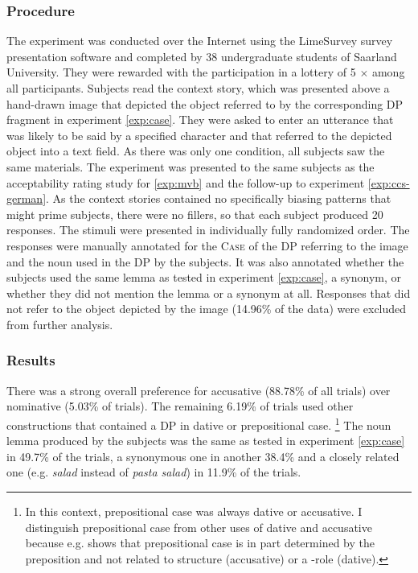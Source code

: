 \subsubsection{Procedure}
The experiment was conducted over the Internet using the LimeSurvey survey presentation software and completed by 38 undergraduate students of Saarland University. They were rewarded with the participation in a lottery of 5 $\times$  among all participants. Subjects read the context story, which was presented above a hand-drawn image that depicted the object referred to by the corresponding DP fragment in experiment \ref{exp:case}. They were asked to enter an utterance that was likely to be said by a specified character and that referred to the depicted object into a text field. As there was only one condition, all subjects saw the same materials. The experiment was presented to the same subjects as the acceptability rating study for \ref{exp:mvb} and the follow-up to experiment \ref{exp:ccs-german}. As the context stories contained no specifically biasing patterns that might prime subjects, there were no fillers, so that each subject produced 20 responses. The stimuli were presented in individually fully randomized order. The responses were manually annotated for the \textsc{Case} of the DP referring to the image and the noun used in the DP by the subjects. It was also annotated whether the subjects used the same lemma as tested in experiment \ref{exp:case}, a synonym, or whether they did not mention the lemma or a synonym at all. Responses that did not refer to the object depicted by the image (14.96\% of the data) were excluded from further analysis.

\subsubsection{Results}\largerpage[1.75]
There was a strong overall preference for accusative (88.78\% of all trials) over nominative (5.03\% of trials). The remaining 6.19\% of trials used other constructions that contained a DP in dative or prepositional case.%
%
\footnote{In this context, prepositional case was always dative or accusative. I distinguish prepositional case from other uses of dative and accusative because e.g. \citet{zwarts2005} shows that prepositional case is in part determined by the preposition and not related to structure (accusative) or a \texttheta-role (dative).}\afterfn%
%
The noun lemma produced by the subjects was the same as tested in experiment \ref{exp:case} in 49.7\% of the trials, a synonymous one in another 38.4\% and a closely related one (e.g. \textit{salad} instead of \textit{pasta salad}) in 11.9\% of the trials.

